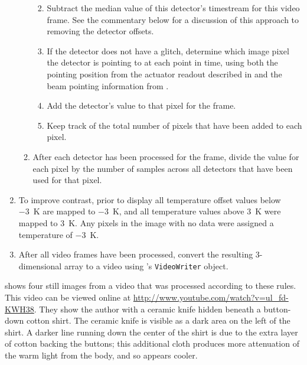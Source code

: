 \begin{enumerate}
\begin{enumerate}
\begin{enumerate}
\begin{enumerate}
      \end{enumerate}
    \item Subtract the median value of this detector's timestream for this video frame.
          See the commentary below for a discussion of this approach to removing the detector offsets.
    \item If the detector does not have a glitch, determine which image pixel the detector is pointing to at each point in time, using both the pointing position from the actuator readout described in  and the beam pointing information from .
    \item Add the detector's value to that pixel for the frame.
    \item Keep track of the total number of pixels that have been added to each pixel.
    \end{enumerate}
  \item After each detector has been processed for the frame, divide the value for each pixel by the number of samples across all detectors that have been used for that pixel.
  \end{enumerate}
  \item To improve contrast, prior to display all temperature offset values below \SI{-3}{\K} are mapped to \SI{-3}{\K}, and all temperature values above \SI{3}{\K} were mapped to \SI{3}{\K}.
        Any pixels in the image with no data were assigned a temperature of \SI{-3}{\K}.
  \item After all video frames have been processed, convert the resulting 3-dimensional array to a video using \MATLAB's \texttt{VideoWriter} object.
\end{enumerate}


 shows four still images from a video that was processed according to these rules.
This video can be viewed online at \url{http://www.youtube.com/watch?v=ul_fd-KWH38}. %
They show the author with a ceramic knife hidden beneath a button-down cotton shirt.
The ceramic knife is visible as a dark area on the left of the shirt.
A darker line running down the center of the shirt is due to the extra layer of cotton backing the buttons; this additional cloth produces more attenuation of the warm light from the body, and so appears cooler.

